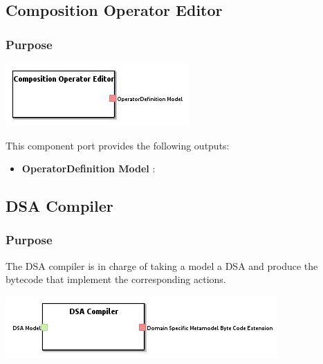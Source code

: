 \documentclass{gemoc} %
\begin{document}
\subsection{Composition Operator Editor}


\subsubsection{Purpose}


\begin{center}
\includegraphics*[trim=0.0cm 0.0cm 0cm 0.0cm, clip=true]{../images/generated/Generated_Composition_Operator_Editor.png}
\end{center}


This component port provides the following outputs:
\begin{itemize}
  \item \textbf{OperatorDefinition Model} :
\end{itemize}


\subsection{DSA Compiler}

\subsubsection{Purpose}
The DSA compiler is in charge of taking a model a DSA and produce the bytecode that implement the corresponding actions.


\begin{center}
\includegraphics*[trim=0.0cm 0.0cm 0cm 0.0cm, clip=true]{../images/generated/Generated_DSA_Compiler.png}
\end{center}
\end{document}
